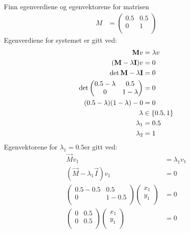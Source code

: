 



Finn egenverdiene og egenvektorene for matrisen
\begin{align*}
  M&=
  \begin{pmatrix}
    0.5 & 0.5 \\
    0 & 1 \\
  \end{pmatrix}
\end{align*}
Egenverdiene for systemet er gitt ved:
\begin{align*}
  \mathbf{M}v &= \lambda v\\
  (\mathbf{M}-\lambda \mathbf{I})v &= 0\\
  \det{\mathbf{M}-\lambda \mathbf{I}} &= 0\\
  \det{
  \begin{pmatrix}
    0.5-\lambda & 0.5 \\
    0 & 1 -\lambda\\
  \end{pmatrix}
  }&= 0\\ 
  (0.5-\lambda)(1-\lambda)-0 &= 0\\
  \lambda & \in \left\{ 0.5, 1 \right \}\\
  \lambda_1 &= 0.5\\
  \lambda_2 &= 1\\
\end{align*}
Egenvektorene for $\lambda_1 = 0.5$er gitt ved:
\begin{align*}
  \vec{M}v_1 &= \lambda_1 v_1\\
  (\vec{M}-\lambda_1\vec{I})v_1 &= 0\\
  \begin{pmatrix}
    0.5-0.5 & 0.5 \\
    0 & 1-0.5 \\
  \end{pmatrix}
  \begin{pmatrix}
    x_1\\
    y_1\\
  \end{pmatrix}&=0\\
  \begin{pmatrix}
    0 & 0.5 \\
    0 & 0.5 \\
  \end{pmatrix}
  \begin{pmatrix}
    x_1\\
    y_1\\
  \end{pmatrix}&=0\\
\end{align*}

